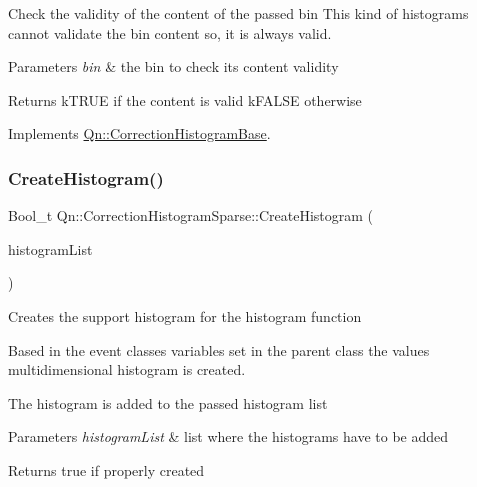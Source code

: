 Check the validity of the content of the passed bin This kind of histograms cannot validate the bin content so, it is always valid. 
\begin{DoxyParams}{Parameters}
{\em bin} & the bin to check its content validity \\
\hline
\end{DoxyParams}
\begin{DoxyReturn}{Returns}
k\+T\+R\+UE if the content is valid k\+F\+A\+L\+SE otherwise 
\end{DoxyReturn}


Implements \mbox{\hyperlink{classQn_1_1CorrectionHistogramBase_a4db2c92ceaffefaa91475a721612d80d}{Qn\+::\+Correction\+Histogram\+Base}}.

\mbox{\label{classQn_1_1CorrectionHistogramSparse_a53ee93b38933721305a26860324a03ea}} 
\subsubsection{\texorpdfstring{Create\+Histogram()}{CreateHistogram()}}
{\footnotesize\ttfamily Bool\+\_\+t Qn\+::\+Correction\+Histogram\+Sparse\+::\+Create\+Histogram (\begin{DoxyParamCaption}\item[{T\+List $\ast$}]{histogram\+List }\end{DoxyParamCaption})}

Creates the support histogram for the histogram function

Based in the event classes variables set in the parent class the values multidimensional histogram is created.

The histogram is added to the passed histogram list


\begin{DoxyParams}{Parameters}
{\em histogram\+List} & list where the histograms have to be added \\
\hline
\end{DoxyParams}
\begin{DoxyReturn}{Returns}
true if properly created 
\end{DoxyReturn}
\mbox{\label{classQn_1_1CorrectionHistogramSparse_a0bb5a6f7772532ed7a174cc688cf5b92}} 

